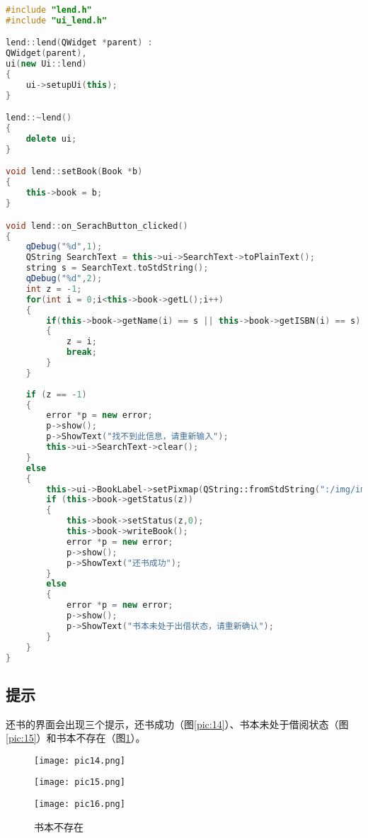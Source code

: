 \documentclass[forprint]{shmtu}
\begin{document}
\begin{lstlisting}[language=C++]
#include "lend.h"
#include "ui_lend.h"

lend::lend(QWidget *parent) :
QWidget(parent),
ui(new Ui::lend)
{
	ui->setupUi(this);
}

lend::~lend()
{
	delete ui;
}

void lend::setBook(Book *b)
{
	this->book = b;
}

void lend::on_SerachButton_clicked()
{
	qDebug("%d",1);
	QString SearchText = this->ui->SearchText->toPlainText();
	string s = SearchText.toStdString();
	qDebug("%d",2);
	int z = -1;
	for(int i = 0;i<this->book->getL();i++)
	{
		if(this->book->getName(i) == s || this->book->getISBN(i) == s)
		{
			z = i;
			break;
		}
	}
	
	if (z == -1)
	{
		error *p = new error;
		p->show();
		p->ShowText("找不到此信息，请重新输入");
		this->ui->SearchText->clear();
	}
	else
	{
		this->ui->BookLabel->setPixmap(QString::fromStdString(":/img/img/book/" + this->book->getISBN(z) +".jpg"));
		if (this->book->getStatus(z))
		{
			this->book->setStatus(z,0);
			this->book->writeBook();
			error *p = new error;
			p->show();
			p->ShowText("还书成功");
		}
		else
		{
			error *p = new error;
			p->show();
			p->ShowText("书本未处于出借状态，请重新确认");
		}
	}
}
\end{lstlisting}

\subsection{提示}

还书的界面会出现三个提示，还书成功（图\ref{pic:14}）、书本未处于借阅状态（图\ref{pic:15}）和书本不存在（图\ref{pic:16}）。

\begin{figure}[!htbp]
	\centering
	\begin{minipage}[!htbp]{0.33\linewidth}
		\centering
		\texttt{[image: pic14.png]}
		\caption{还书成功}
		\label{pic:14}
	\end{minipage}%
	\begin{minipage}[!htbp]{0.33\linewidth}
		\centering
		\texttt{[image: pic15.png]}
		\caption{书本未借阅}
		\label{pic:15}
	\end{minipage}%
	\begin{minipage}[!htbp]{0.33\linewidth}
		\centering
		\texttt{[image: pic16.png]}
		\caption{书本不存在}
		\label{pic:16}
	\end{minipage}%
\end{figure}
\end{document}
